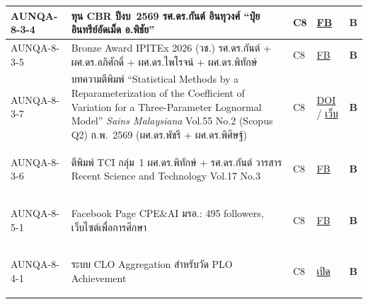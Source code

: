 \begin{longtable}{|>{\raggedright\arraybackslash}p{2.3cm}|>{\raggedright\arraybackslash}p{6.5cm}|>{\centering\arraybackslash}p{1.1cm}|>{\raggedright\arraybackslash}p{3.4cm}|>{\centering\arraybackslash}p{0.8cm}|}
  \hline
  \hypertarget{ref:AUNQA-8-3-4}{AUNQA-8-3-4} & ทุน CBR ปีงบ~2569 รศ.ดร.กันต์ อินทุวงศ์ ``ปุ๋ยอินทรีย์อัดเม็ด อ.พิชัย'' & C8 & \href{https://www.facebook.com/photo.php?fbid=1373888544769393}{FB} & \textcolor{blue!70!black}{\textbf{B}} \\
  \hline
  \hypertarget{ref:AUNQA-8-3-5}{AUNQA-8-3-5} & Bronze Award IPITEx 2026 (วช.) รศ.ดร.กันต์ + ผศ.ดร.อภิศักดิ์ + ผศ.ดร.ไพโรจน์ + ผศ.ดร.พิทักษ์ & C8 & \href{https://www.facebook.com/photo.php?fbid=1309808267844088}{FB} & \textcolor{blue!70!black}{\textbf{B}} \\
  \hline
  \hypertarget{ref:AUNQA-8-3-7}{AUNQA-8-3-7} & บทความตีพิมพ์ ``Statistical Methods by a Reparameterization of the Coefficient of Variation for a Three-Parameter Lognormal Model'' \textit{Sains Malaysiana} Vol.55 No.2 (Scopus Q2) ก.พ.~2569 (ผศ.ดร.พัชรี + ผศ.ดร.พิศิษฐ์) & C8 & \href{https://doi.org/10.17576/jsm-2026-5502-14}{DOI} / \href{https://www.ukm.my/jsm/english_journals/vol55num2_2026/vol55num2_2026\%2014.html}{เว็บ} & \textcolor{blue!70!black}{\textbf{B}} \\
  \hline
  \hypertarget{ref:AUNQA-8-3-6}{AUNQA-8-3-6} & ตีพิมพ์ TCI กลุ่ม~1 ผศ.ดร.พิทักษ์ + รศ.ดร.กันต์ วารสาร Recent Science and Technology Vol.17 No.3 & C8 & \href{https://www.facebook.com/photo.php?fbid=1263136662511249}{FB} & \textcolor{blue!70!black}{\textbf{B}} \\
  \hline
  \hypertarget{ref:AUNQA-8-5-1}{AUNQA-8-5-1} & Facebook Page CPE\&AI มรอ.: 495 followers, เว็บไซต์เพื่อการศึกษา & C8 & \href{https://www.facebook.com/profile.php?id=676146915589459}{FB} & \textcolor{blue!70!black}{\textbf{B}} \\
  \hline
  \hypertarget{ref:AUNQA-8-4-1}{AUNQA-8-4-1} & ระบบ CLO Aggregation สำหรับวัด PLO Achievement & C8 & \href{https://syweb.kidcbc.work/Eviden_aunqa68/\%E0\%B8\%A3\%E0\%B8\%B0\%E0\%B9\%80\%E0\%B8\%9A\%E0\%B8\%B5\%E0\%B8\%A2\%E0\%B8\%9A\%E0\%B8\%82\%E0\%B9\%89\%E0\%B8\%AD\%E0\%B8\%9A\%E0\%B8\%B1\%E0\%B8\%87\%E0\%B8\%84\%E0\%B8\%B1\%E0\%B8\%9A\%E0\%B9\%81\%E0\%B8\%A5\%E0\%B8\%B0\%E0\%B8\%9B\%E0\%B8\%A3\%E0\%B8\%B0\%E0\%B8\%81\%E0\%B8\%B2\%E0\%B8\%A8\%E0\%B8\%AD\%E0\%B8\%B7\%E0\%B9\%88\%E0\%B8\%99\%E0\%B9\%86/AUNQA-8-4-1_CLO_PLO_Achievement_2568.pdf}{เปิด} & \textcolor{blue!70!black}{\textbf{B}} \\
  \hline

\end{longtable}
